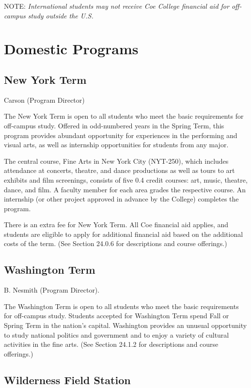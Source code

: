 \documentclass[
  letterpaper,
]{scrbook}
\begin{document}
NOTE: \emph{International students may not receive Coe College financial
aid for off-campus study outside the U.S.}

\section{Domestic Programs}\label{domestic-programs}

\subsection{New York Term}\label{new-york-term}

Carson (Program Director)

The New York Term is open to all students who meet the basic
requirements for off-campus study. Offered in odd-numbered years in the
Spring Term, this program provides abundant opportunity for experiences
in the performing and visual arts, as well as internship opportunities
for students from any major.

The central course, Fine Arts in New York City (NYT-250), which includes
attendance at concerts, theatre, and dance productions as well as tours
to art exhibits and film screenings, consists of five 0.4 credit
courses: art, music, theatre, dance, and film. A faculty member for each
area grades the respective course. An internship (or other project
approved in advance by the College) completes the program.

There is an extra fee for New York Term. All Coe financial aid applies,
and students are eligible to apply for additional financial aid based on
the additional costs of the term. (See Section 24.0.6 for descriptions
and course offerings.)

\subsection{Washington Term}\label{washington-term}

B. Nesmith (Program Director).

The Washington Term is open to all students who meet the basic
requirements for off-campus study. Students accepted for Washington Term
spend Fall or Spring Term in the nation's capital. Washington provides
an unusual opportunity to study national politics and government and to
enjoy a variety of cultural activities in the fine arts. (See Section
24.1.2 for descriptions and course offerings.)

\subsection{Wilderness Field Station}\label{wilderness-field-station}
\end{document}
